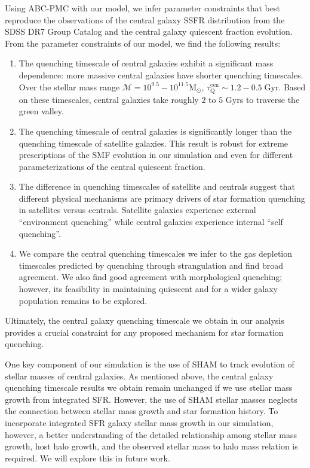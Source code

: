 \documentclass[iop,apj,tighten,twocolappendix,numberedappendix]{emulateapj}
\newcommand{\taucen}{\tau_\mathrm{Q}^\mathrm{cen}}
\begin{document}
Using ABC-PMC with our model, we infer parameter constraints that best 
reproduce the observations of the central galaxy SSFR distribution from the 
SDSS DR7 Group Catalog and the central galaxy quiescent fraction evolution.
From the parameter constraints of our model, we find the following 
results: 
\begin{enumerate}
\item The quenching timescale of central galaxies exhibit a significant mass 
dependence: more massive central galaxies have shorter quenching timescales. 
Over the stellar mass range $\mathcal{M} = 10^{9.5} - 10^{11.5}\mathrm{M}_\odot$, 
$\taucen \sim 1.2 - 0.5 \;\mathrm{Gyr}$. Based on these timescales, 
central galaxies take roughly $2$ to $5$ Gyrs to traverse the green valley.  

\item The quenching timescale of central galaxies is significantly longer
than the quenching timescale of satellite galaxies. This result is robust for  
extreme prescriptions of the SMF evolution in our simulation and 
even for different parameterizations of the central quiescent fraction. 

\item The difference in quenching timescales of satellite and centrals
suggest that different physical mechanisms are primary drivers of 
star formation quenching in satellites versus centrals. Satellite galaxies  
experience external ``environment quenching'' while central galaxies  
experience internal ``self quenching''. 

\item We compare the central quenching timescales we infer to the 
gas depletion timescales predicted by quenching through strangulation 
and find broad agreement. We also find good agreement with 
morphological quenching; however, its feasibility in maintaining 
quiescent and for a wider galaxy population remains to be explored.

\end{enumerate}
\noindent Ultimately, the central galaxy quenching timescale we obtain in our analysis 
provides a crucial constraint for any proposed mechanism for star formation
quenching. 

One key component of our simulation is the use of SHAM to track evolution of
stellar masses of central galaxies. As mentioned above, the central galaxy 
quenching timescale results we obtain remain unchanged if we use stellar 
mass growth from integrated SFR. However, the use of SHAM stellar masses 
neglects the connection between stellar mass growth and star formation history. 
To incorporate integrated SFR galaxy stellar mass growth in our simulation, 
however, a better understanding of the detailed relationship among  
stellar mass growth, host halo growth, and the observed stellar mass to halo mass
relation is required. We will explore this in future work.  
\end{document}
